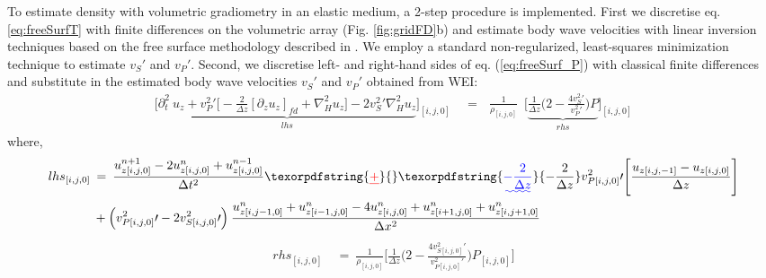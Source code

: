 \documentclass{article} %
\providecommand{\DIFaddtex}[1]{{\protect\color{blue}\uwave{#1}}} %
\providecommand{\DIFdeltex}[1]{{\protect\color{red}\sout{#1}}}                      %
\providecommand{\DIFaddbegin}{} %
\providecommand{\DIFaddend}{} %
\providecommand{\DIFdelbegin}{} %
\providecommand{\DIFdelend}{} %
\providecommand{\DIFadd}[1]{\texorpdfstring{\DIFaddtex{#1}}{#1}} %
\providecommand{\DIFdel}[1]{\texorpdfstring{\DIFdeltex{#1}}{}} %
\newcommand{\DIFscaledelfig}{0.5}
\newlength{\DIFdelgraphicswidth} %
\newlength{\DIFdelgraphicsheight} %
\newcommand{\DIFaddincludegraphics}[2][]{{\color{blue}\fbox{\DIFOincludegraphics[#1]{#2}}}} %
\newcommand{\DIFdelincludegraphics}[2][]{%
\sbox{\DIFdelgraphicsbox}{\DIFOincludegraphics[#1]{#2}}%
\settoboxwidth{\DIFdelgraphicswidth}{\DIFdelgraphicsbox} %
\settoboxtotalheight{\DIFdelgraphicsheight}{\DIFdelgraphicsbox} %
\scalebox{\DIFscaledelfig}{%
\parbox[b]{\DIFdelgraphicswidth}{\usebox{\DIFdelgraphicsbox}\\[-\baselineskip] \rule{\DIFdelgraphicswidth}{0em}}\llap{\resizebox{\DIFdelgraphicswidth}{\DIFdelgraphicsheight}{%
\setlength{\unitlength}{\DIFdelgraphicswidth}%
\begin{picture}(1,1)%
\thicklines\linethickness{2pt} %
{\color[rgb]{1,0,0}\put(0,0){\framebox(1,1){}}}%
{\color[rgb]{1,0,0}\put(0,0){\line( 1,1){1}}}%
{\color[rgb]{1,0,0}\put(0,1){\line(1,-1){1}}}%
\end{picture}%
}\hspace*{3pt}}} %
} %
\DeclareRobustCommand{\DIFaddbegin}{\DIFOaddbegin \let\includegraphics\DIFaddincludegraphics} %
\DeclareRobustCommand{\DIFaddend}{\DIFOaddend \let\includegraphics\DIFOincludegraphics} %
\DeclareRobustCommand{\DIFdelbegin}{\DIFOdelbegin \let\includegraphics\DIFdelincludegraphics} %
\DeclareRobustCommand{\DIFdelend}{\DIFOaddend \let\includegraphics\DIFOincludegraphics} %
\begin{document}
	To estimate density with volumetric gradiometry in an elastic medium, a 2-step procedure is implemented. First we discretise eq. \eqref{eq:freeSurfT} with finite differences on the volumetric array (Fig. \ref{fig:gridFD}b) and estimate body wave velocities with linear inversion techniques based on the free surface methodology described in \textcite{curtis2002volumetric}. We employ a standard non-regularized, least-squares minimization technique to estimate $v_{S}\prime$ and $v_{P}\prime$. 
	Second, we discretise left- and right-hand sides of eq. (\ref{eq:freeSurf_P}) with classical finite differences and substitute in the estimated body wave velocities $v_{S}\prime$ and $v_{P}\prime$ obtained from WEI:
	\begin{align} 
		\Bigg[\underbrace{\partial_{t}^{2} \: u_{z}  +  v_{P}^{2}\prime \Big[ - \frac{2}{\Delta z}  [\partial_{z} u_{z}]_{fd} +  \nabla_{H}^{2}u_{z} \Big] - 2 v_{S}^{2}\prime \nabla_{H}^{2}u_{z}}_\text{$lhs$}\Bigg]_{[i,j,0]}  \: &=  \: \: \: \frac{1}{\rho_{[i,j,0]}} \: \;  \Bigg[ \underbrace{\frac{1}{\Delta z} \Big( 2 - \frac{4v_{S}^{2}\prime}{v_{P}^{2}\prime}\Big) P}_\text{$rhs$}\Bigg]_{[i,j,0]}
		\label{eq:freeSurf_P2}   
	\end{align}
	where,
	\begin{align} 
		lhs_{[i,j,0]} \:&=\:  \frac{ u_{z[i,j,0]}^{n+1} - 2u_{z[i,j,0]}^{n} + u_{z[i,j,0]}^{n-1} }{\Delta t^{2}} \DIFdelbegin \DIFdel{+ }\DIFdelend \DIFaddbegin \DIFadd{- \frac{2}{\Delta z} }\DIFaddend v_{P[i,j,0]}^{2}\prime \Bigg[ \frac{u_{z [i,j,-1]}-u_{z [i,j,0]}}{\Delta z}\Bigg] \nonumber\\
		&+ \Big(v_{P[i,j,0]}^{2}\prime - 2v_{S [i,j,0]}^{2}\prime \Big) \: \frac{ u_{z[i,j-1,0]}^{n} + u_{z[i-1,j,0]}^{n} - 4u_{z[i,j,0]}^{n} + u_{z[i+1,j,0]}^{n} + u_{z[i,j+1,0]}^{n}}{\Delta x^{2}}
	\label{eq:FS_discr_LHS} 
	\end{align}
	\begin{align} 
		rhs_{[i,j,0]} \:&=\: \frac{1}{\rho_{[i,j,0]}}  \Bigg[\frac{1}{\Delta z} \Big(2-\frac{4v_{S[i,j,0]}^{2}\prime }{v_{P[i,j,0]}^{2}\prime } \Big) P_{[i,j,0]} \Bigg]
		\label{eq:FS_discr_RHS}   
	\end{align}
\end{document}
